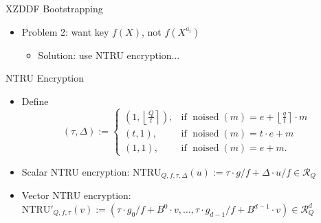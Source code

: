 \documentclass[aspectratio=169]{beamer}
\begin{document}
\begin{frame}{XZDDF Bootstrapping}
    \begin{itemize}
        \item Problem 2: want key $f(X)$, not $f(X^{a_i}) $
        \begin{itemize}
            \item Solution: use NTRU encryption...
        \end{itemize}
    \end{itemize}

\end{frame}


\begin{frame}{NTRU Encryption}
    \begin{itemize}
        \item Define
            \begin{equation*}
              (\tau, \Delta) :=
                \begin{cases}
                  \left(1, \left\lfloor \frac{Q}{t} \right\rceil \right), & \text{if $\operatorname{noised}(m) = e + \left \lfloor \frac{q}{t} \right \rceil \cdot m$} \\
                  (t,1), & \text{if $\operatorname{noised}(m) = t \cdot e + m$}\\
                  (1,1), & \text{if $\operatorname{noised}(m) = e + m$}.
                \end{cases}       
            \end{equation*}
    \end{itemize}
    
    \begin{itemize}
        \item Scalar NTRU encryption: \; $\mathrm{NTRU}_{Q, f, \tau, \Delta}(u) := \tau \cdot g/f + \Delta \cdot u/f \in \mathcal{R}_Q$
    \end{itemize}
    
    \begin{itemize}
        \item Vector NTRU encryption: \; $\mathrm{NTRU}'_{Q, f, \tau}(v) := (\tau \cdot g_0/f + B^0\cdot v, \ldots, \tau \cdot g_{d-1}/f + B^{d-1}\cdot v) \in \mathcal{R}_Q^d$
    \end{itemize}
\end{frame}
\end{document}
